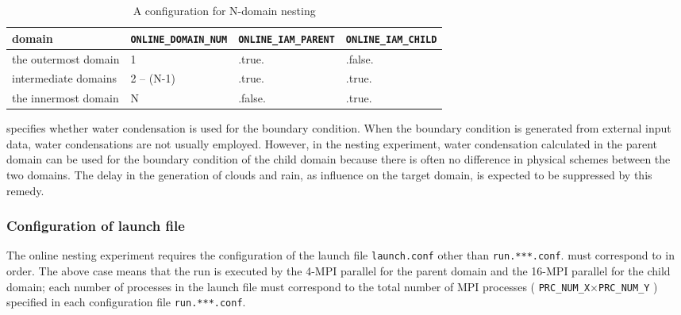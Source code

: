 \begin{table}[htb]
\begin{center}
\caption{A configuration for N-domain nesting}
\begin{tabularx}{150mm}{|l|l|l|X|} \hline
 \rowcolor[gray]{0.9} domain & \verb|ONLINE_DOMAIN_NUM| & \verb|ONLINE_IAM_PARENT| & \verb|ONLINE_IAM_CHILD|\\ \hline
 the outermost domain & 1          & .true.  & .false. \\ \hline
 intermediate domains & 2 -- (N-1) & .true.  & .true. \\ \hline
 the innermost domain & N          & .false. & .true. \\ \hline
\end{tabularx}
\label{tab:triple_nested}
\end{center}
\end{table}


 specifies whether water condensation is used for the boundary condition. When the boundary condition is generated from external input data, water condensations are not usually employed. However, in the nesting experiment, water condensation calculated in the parent domain can be used for the boundary condition of the child domain because there is often no difference in physical schemes between the two domains.
The delay in the generation of clouds and rain, as influence on the target domain, is expected to be suppressed by this remedy.

\subsubsection{Configuration of launch file}
\label{subsubsec:launch}
The online nesting experiment requires the configuration of the launch file \verb|launch.conf|
other than \verb|run.***.conf|.
 must correspond to  in order.
The above case means that
the run is executed by
the 4-MPI parallel for the parent domain 
and the 16-MPI parallel for the child domain;
each number of processes in the launch file 
must correspond to the total number of MPI processes ( \verb|PRC_NUM_X|$\times$\verb|PRC_NUM_Y| )
specified in each configuration file \verb|run.***.conf|.

